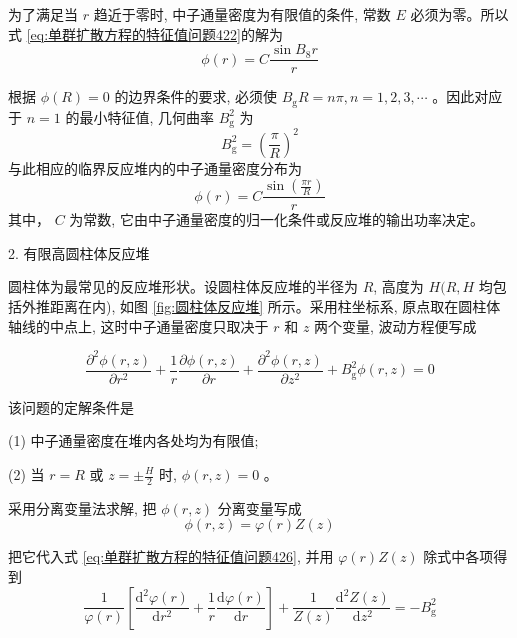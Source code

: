 \documentclass{Sichuan Normal University}
\begin{document}
为了满足当 $r$ 趋近于零时, 中子通量密度为有限值的条件, 常数 $E$ 必须为零。所以式 \eqref{eq:单群扩散方程的特征值问题422}的解为
\begin{equation}
\phi(r)=C \frac{\sin B_8 r}{r}
\end{equation}

根据 $\phi(R)=0$ 的边界条件的要求, 必须使 $B_{\mathrm{g}} R=n \pi, n=1,2,3, \cdots$ 。因此对应于 $n=1$ 的最小特征值, 几何曲率 $B_{\mathrm{g}}^2$ 为
\begin{equation}
B_{\mathrm{g}}^2=\left(\frac{\pi}{R}\right)^2
\end{equation}
与此相应的临界反应堆内的中子通量密度分布为
\begin{equation}
\phi(r)=C \frac{\sin \left(\frac{\pi r}{R}\right)}{r}
\label{相应的临界反应堆内的中子通量密度分布425}
\end{equation}其中， $C$ 为常数, 它由中子通量密度的归一化条件或反应堆的输出功率决定。

2. 有限高圆柱体反应堆

圆柱体为最常见的反应堆形状。设圆柱体反应堆的半径为 $R$, 高度为 $H(R, H$ 均包括外推距离在内), 如图 \ref{fig:圆柱体反应堆} 所示。采用柱坐标系, 原点取在圆柱体轴线的中点上, 这时中子通量密度只取决于 $r$ 和 $z$ 两个变量, 波动方程便写成

  
\begin{equation}
\frac{\partial^2 \phi(r, z)}{\partial r^2}+\frac{1}{r} \frac{\partial \phi(r, z)}{\partial r}+\frac{\partial^2 \phi(r, z)}{\partial z^2}+B_{\mathrm{g}}^2 \phi(r, z)=0
\label{eq:单群扩散方程的特征值问题426}
\end{equation}

该问题的定解条件是

(1) 中子通量密度在堆内各处均为有限值;

(2) 当 $r=R$ 或 $z= \pm \frac{H}{2}$ 时, $\phi(r, z)=0$ 。

采用分离变量法求解, 把 $\phi(r, z)$ 分离变量写成
\begin{equation}
\phi(r, z)=\varphi(r) Z(z)
\end{equation}

把它代入式 \eqref{eq:单群扩散方程的特征值问题426}, 并用 $\varphi(r) Z(z)$ 除式中各项得到
\begin{equation}
\frac{1}{\varphi(r)}\left[\frac{\mathrm{d}^2 \varphi(r)}{\mathrm{d} r^2}+\frac{1}{r} \frac{\mathrm{d} \varphi(r)}{\mathrm{d} r}\right]+\frac{1}{Z(z)} \frac{\mathrm{d}^2 Z(z)}{\mathrm{d} z^2}=-B_{\mathrm{g}}^2
\end{equation}
\end{document}
